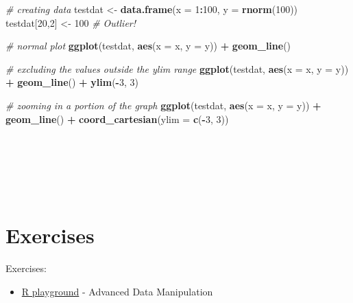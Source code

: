 \documentclass[
]{svmono}
\newenvironment{Shaded}{\begin{snugshade}}{\end{snugshade}}
\newcommand{\AttributeTok}[1]{\textcolor[rgb]{0.13,0.29,0.53}{#1}}
\newcommand{\CommentTok}[1]{\textcolor[rgb]{0.56,0.35,0.01}{\textit{#1}}}
\newcommand{\DecValTok}[1]{\textcolor[rgb]{0.00,0.00,0.81}{#1}}
\newcommand{\FunctionTok}[1]{\textcolor[rgb]{0.13,0.29,0.53}{\textbf{#1}}}
\newcommand{\NormalTok}[1]{#1}
\newcommand{\OtherTok}[1]{\textcolor[rgb]{0.56,0.35,0.01}{#1}}
\newcommand{\SpecialCharTok}[1]{\textcolor[rgb]{0.81,0.36,0.00}{\textbf{#1}}}
\providecommand{\tightlist}{%
  \setlength{\itemsep}{0pt}\setlength{\parskip}{0pt}}
\begin{document}
\begin{Shaded}
\begin{Highlighting}[]
\CommentTok{\# creating data}
\NormalTok{testdat }\OtherTok{\textless{}{-}} \FunctionTok{data.frame}\NormalTok{(}\AttributeTok{x =} \DecValTok{1}\SpecialCharTok{:}\DecValTok{100}\NormalTok{, }
                      \AttributeTok{y =} \FunctionTok{rnorm}\NormalTok{(}\DecValTok{100}\NormalTok{))}
\NormalTok{testdat[}\DecValTok{20}\NormalTok{,}\DecValTok{2}\NormalTok{] }\OtherTok{\textless{}{-}} \DecValTok{100}  \CommentTok{\# Outlier!}

\CommentTok{\# normal plot}
\FunctionTok{ggplot}\NormalTok{(testdat, }\FunctionTok{aes}\NormalTok{(}\AttributeTok{x =}\NormalTok{ x, }\AttributeTok{y =}\NormalTok{ y)) }\SpecialCharTok{+} 
        \FunctionTok{geom\_line}\NormalTok{()}

\CommentTok{\# excluding the values outside the ylim range}
\FunctionTok{ggplot}\NormalTok{(testdat, }\FunctionTok{aes}\NormalTok{(}\AttributeTok{x =}\NormalTok{ x, }\AttributeTok{y =}\NormalTok{ y)) }\SpecialCharTok{+} 
        \FunctionTok{geom\_line}\NormalTok{() }\SpecialCharTok{+} 
        \FunctionTok{ylim}\NormalTok{(}\SpecialCharTok{{-}}\DecValTok{3}\NormalTok{, }\DecValTok{3}\NormalTok{)}

\CommentTok{\# zooming in a portion of the graph}
\FunctionTok{ggplot}\NormalTok{(testdat, }\FunctionTok{aes}\NormalTok{(}\AttributeTok{x =}\NormalTok{ x, }\AttributeTok{y =}\NormalTok{ y)) }\SpecialCharTok{+} 
        \FunctionTok{geom\_line}\NormalTok{() }\SpecialCharTok{+} 
        \FunctionTok{coord\_cartesian}\NormalTok{(}\AttributeTok{ylim =} \FunctionTok{c}\NormalTok{(}\SpecialCharTok{{-}}\DecValTok{3}\NormalTok{, }\DecValTok{3}\NormalTok{))}
\end{Highlighting}
\end{Shaded}

~

~

~

\hypertarget{exercises-1}{%
\section{Exercises}\label{exercises-1}}

Exercises:

\begin{itemize}
\tightlist
\item
  \href{https://federicoroscioli.shinyapps.io/exercises/}{R playground} -
  Advanced Data Manipulation
  \newpage
\end{itemize}
\end{document}
